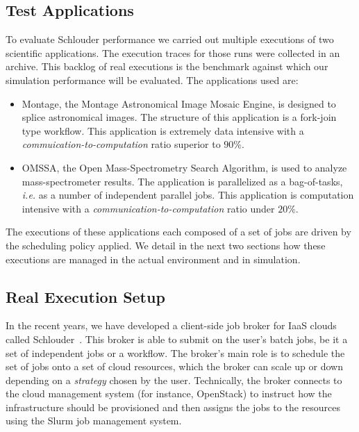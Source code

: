 \documentclass[10pt,conference,compsocconf]{IEEEtran}
\begin{document}
\subsection{Test Applications}\label{sc:setup}

To evaluate Schlouder performance we  carried out multiple executions of two
scientific applications. The  execution traces for those runs  were collected in
an archive. This  backlog of real executions is the  benchmark against which our
simulation performance will be evaluated. The applications used are:

\begin{itemize}
\item Montage\cite{montage2009},  the Montage Astronomical Image  Mosaic Engine,
  is designed to  splice astronomical images. The structure  of this application
  is a  fork-join type  workflow. This application  is extremely  data intensive
  with a \emph{commuication-to-computation} ratio superior to $90\%$.

\item OMSSA\cite{Geer2004}, the Open Mass-Spectrometry Search Algorithm, is used
  to analyze  mass-spectrometer results.  The application  is parallelized  as a
  bag-of-tasks, \textit{i.e.}  as a  number of  independent parallel  jobs. This
  application        is        computation        intensive        with        a
  \emph{communication-to-computation} ratio under $20\%$.
\end{itemize}

The executions of these applications each composed  of a set of jobs are driven
by the scheduling policy applied. We detail in the next two sections how these
executions are managed in the actual environment and in simulation.  

\subsection{Real Execution Setup}
In the recent years, we have developed  a client-side job broker for IaaS clouds
called Schlouder~\cite{Michon17}.  This broker is  able to submit on  the user's
batch jobs, be  it a set of  independent jobs or a workflow.   The broker's main
role is  to schedule the set  of jobs onto a  set of cloud resources,  which the
broker can scale up  or down depending on a \emph{strategy}  chosen by the user.
Technically, the broker  connects to the cloud management  system (for instance,
OpenStack) to  instruct how  the infrastructure should  be provisioned  and then
assigns the jobs to the resources using the Slurm job management system.
\end{document}
